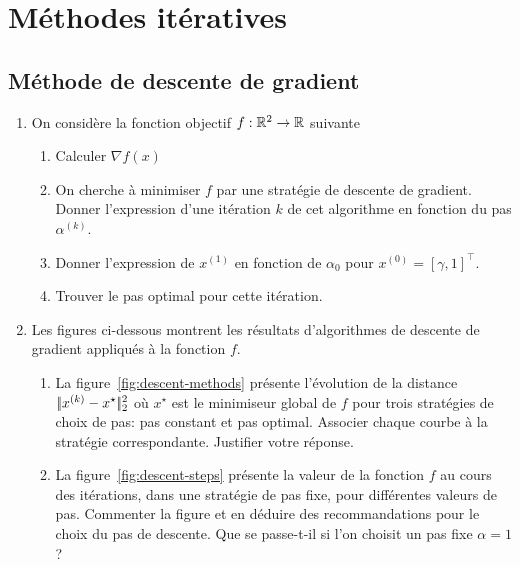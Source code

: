 \chapter{Méthodes itératives}


\section{Méthode de descente de gradient}

\begin{enumerate}
	\item On considère la fonction objectif $f:\mathbb{R}^2 \to \mathbb{R}$ suivante
	
	\begin{enumerate}
		\item Calculer $\nabla f(x)$
		\item On cherche à minimiser $f$ par une stratégie de descente de gradient. Donner l'expression d'une itération $k$ de cet algorithme en fonction du pas $\alpha^{(k)}$.
		\item Donner l'expression de $x^{(1)}$ en fonction de $\alpha_0$ pour $x^{(0)} = [\gamma,1]^\top$.
		\item Trouver le pas optimal pour cette itération.
	\end{enumerate}
	
	\item Les figures ci-dessous montrent les résultats d'algorithmes de descente de gradient appliqués à la fonction $f$.
	\begin{enumerate}
		\item La figure~\ref{fig:descent-methods} présente l'évolution de la distance $|\!| x^{(k)}-x^{\star} |\!|_2^2$ où $x^{\star}$ est le minimiseur global de $f$ pour trois stratégies de choix de pas: pas constant et pas optimal. Associer chaque courbe à la stratégie correspondante. Justifier votre réponse.
		
		\item La figure~\ref{fig:descent-steps} présente la valeur de la fonction $f$ au cours des itérations, dans une stratégie de pas fixe, pour différentes valeurs de pas. Commenter la figure et en déduire des recommandations pour le choix du pas de descente. Que se passe-t-il si l'on choisit un pas fixe $\alpha = 1$?
	\end{enumerate}
\end{enumerate}

